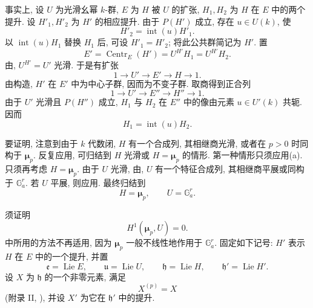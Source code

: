 
事实上, 设 \(U\) 为光滑幺幂 \(k\)-群, \(E\) 为 \(H\) 被 \(U\) 的扩张,
\(H_1,H_2\) 为 \(H\) 在 \(E\) 中的两个提升.
设 \(H'_1,H'_2\) 为 \(H'\) 的相应提升.
由于 \(P(H')\) 成立, 存在 \(u\in U(k)\), 使
\[
  H'_2=\operatorname{int}(u)H'_1.
\]
以 \(\operatorname{int}(u)H_1\) 替换 \(H_1\) 后, 可设 \(H'_1=H'_2\);
将此公共群简记为 \(H'\). 置
\[
  E'=\operatorname{Centr}_E(H')
     =U^{H'}H_1
     =U^{H'}H_2.
\]
由, \(U^{H'}=U'\) 光滑. 于是有扩张
\[
  1\longrightarrow U'\longrightarrow E'
    \longrightarrow H\longrightarrow1.
\]
由构造, \(H'\) 在 \(E'\) 中为中心子群, 因而为不变子群.
取商得到正合列
\[
  1\longrightarrow U'\longrightarrow E''
    \longrightarrow H''\longrightarrow1.
\]
由于 \(U'\) 光滑且 \(P(H'')\) 成立,
\(H_1\) 与 \(H_2\) 在 \(E''\) 中的像由元素 \(u\in U'(k)\) 共轭. 因而
\[
  H_1=\operatorname{int}(u)H_2.
\]

要证明,
注意到由于 \(k\) 代数闭, \(H\) 有一个合成列, 其相继商光滑,
或者在 \(p>0\) 时同构于 \(\boldsymbol\mu_p\).
反复应用, 可归结到 \(H\) 光滑或 \(H=\boldsymbol\mu_p\) 的情形.
第一种情形只须应用(a).
只须再考虑 \(H=\boldsymbol\mu_p\).
由于 \(U\) 光滑, 由,
\(U\) 有一个特征合成列, 其相继商平展或同构于 \(\mathbb G_a^r\).
若 \(U\) 平展, 则应用.
最终归结到
\[
  H=\boldsymbol\mu_p,\qquad U=\mathbb G_a^r.
\]

须证明
\[
  H^1(\boldsymbol\mu_p,U)=0.
\]
 中所用的方法不再适用,
因为 \(\boldsymbol\mu_p\) 一般不线性地作用于 \(\mathbb G_a^r\).
固定如下记号: \(H'\) 表示 \(H\) 在 \(E\) 中的一个提升, 并置
\[
  \mathfrak e=\operatorname{Lie}E,\qquad
  \mathfrak u=\operatorname{Lie}U,\qquad
  \mathfrak h=\operatorname{Lie}H,\qquad
  \mathfrak h'=\operatorname{Lie}H'.
\]
设 \(X\) 为 \(\mathfrak h\) 的一个非零元素, 满足
\[
  X^{(p)}=X
\]
(附录 II, ),
并设 \(X'\) 为它在 \(\mathfrak h'\) 中的提升.

